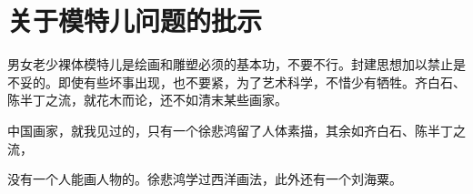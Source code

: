 \section[关于模特儿问题的批示（一九六五年七月十八日）]{关于模特儿问题的批示}


男女老少裸体模特儿是绘画和雕塑必须的基本功，不要不行。封建思想加以禁止是不妥的。即使有些坏事出现，也不要紧，为了艺术科学，不惜少有牺牲。齐白石、陈半丁之流，就花木而论，还不如清末某些画家。

中国画家，就我见过的，只有一个徐悲鸿留了人体素描，其余如齐白石、陈半丁之流，

没有一个人能画人物的。徐悲鸿学过西洋画法，此外还有一个刘海粟。

